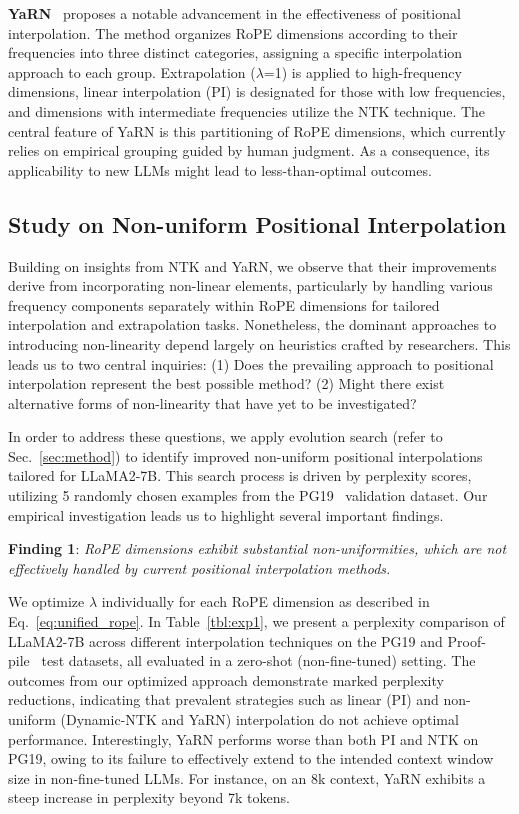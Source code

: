 \textbf{YaRN}~\cite{yarn} proposes a notable advancement in the effectiveness of positional interpolation. The method organizes RoPE dimensions according to their frequencies into three distinct categories, assigning a specific interpolation approach to each group. Extrapolation ($\lambda$=1) is applied to high-frequency dimensions, linear interpolation (PI) is designated for those with low frequencies, and dimensions with intermediate frequencies utilize the NTK technique. The central feature of YaRN is this partitioning of RoPE dimensions, which currently relies on empirical grouping guided by human judgment. As a consequence, its applicability to new LLMs might lead to less-than-optimal outcomes.

\subsection{Study on Non-uniform Positional Interpolation}

Building on insights from NTK and YaRN, we observe that their improvements derive from incorporating non-linear elements, particularly by handling various frequency components separately within RoPE dimensions for tailored interpolation and extrapolation tasks. Nonetheless, the dominant approaches to introducing non-linearity depend largely on heuristics crafted by researchers. This leads us to two central inquiries: (1) Does the prevailing approach to positional interpolation represent the best possible method? (2) Might there exist alternative forms of non-linearity that have yet to be investigated?

In order to address these questions, we apply evolution search (refer to Sec.~\ref{sec:method}) to identify improved non-uniform positional interpolations tailored for LLaMA2-7B. This search process is driven by perplexity scores, utilizing 5 randomly chosen examples from the PG19~\cite{pg19} validation dataset. Our empirical investigation leads us to highlight several important findings.

\textbf{Finding 1}: \textit{RoPE dimensions exhibit substantial non-uniformities, which are not effectively handled by current positional interpolation methods.}

We optimize $\lambda$ individually for each RoPE dimension as described in Eq.~\ref{eq:unified_rope}. In Table~\ref{tbl:exp1}, we present a perplexity comparison of LLaMA2-7B across different interpolation techniques on the PG19 and Proof-pile~\cite{proof-pile} test datasets, all evaluated in a zero-shot (non-fine-tuned) setting. The outcomes from our optimized approach demonstrate marked perplexity reductions, indicating that prevalent strategies such as linear (PI) and non-uniform (Dynamic-NTK and YaRN) interpolation do not achieve optimal performance. Interestingly, YaRN performs worse than both PI and NTK on PG19, owing to its failure to effectively extend to the intended context window size in non-fine-tuned LLMs. For instance, on an 8k context, YaRN exhibits a steep increase in perplexity beyond 7k tokens.

